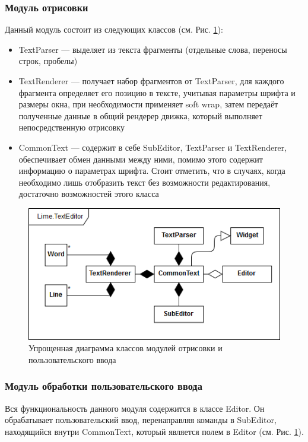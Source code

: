 \documentclass{fefu}
\begin{document}
			\subsubsection{Модуль отрисовки}
				\par Данный модуль состоит из следующих классов (см. Рис. 
				\ref{diag:RendererScheme}):
				\begin{itemize}
					\item TextParser --- выделяет из текста фрагменты (отдельные слова, 
					переносы строк, пробелы)
					\item TextRenderer --- получает набор фрагментов от TextParser, для каждого
					фрагмента определяет его позицию в тексте, учитывая параметры шрифта и 
					размеры окна, при необходимости применяет soft wrap, затем передаёт
					полученные данные в общий рендерер движка, который выполняет
					непосредственную отрисовку
					\item CommonText --- содержит в себе SubEditor, TextParser и TextRenderer,
					обеспечивает обмен данными между ними, помимо этого содержит информацию о
					параметрах шрифта. Стоит отметить, что в случаях, когда необходимо лишь 
					отобразить текст без возможности редактирования, достаточно возможностей
					этого класса
				\end{itemize}
				\begin{figure}[h]
					\centering
					\includegraphics[width=1\linewidth]{diagrams/EditorScheme.png}
					\caption{Упрощенная диаграмма классов модулей отрисовки и пользовательского
					ввода}
					\label{diag:RendererScheme}
				\end{figure}
			\subsubsection{Модуль обработки пользовательского ввода}
				\par Вся функциональность данного модуля содержится в классе Editor. Он
				обрабатывает пользовательский ввод, перенаправляя команды в SubEditor,
				находящийся внутри CommonText, который является полем в Editor (см. Рис. 
				\ref{diag:RendererScheme}).
\end{document}
